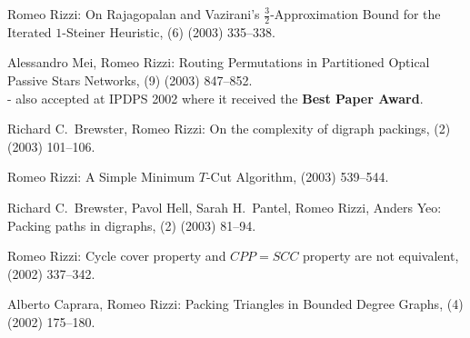 \begin{etaremune}
  \item {\sc Romeo Rizzi:}
   \newblock  On Rajagopalan and Vazirani's $\frac{3}{2}$-Approximation
              Bound for the Iterated $1$-Steiner Heuristic,
   (6) (2003) 335--338.

  \item {\sc Alessandro Mei, Romeo Rizzi:}
   \newblock  Routing Permutations in Partitioned Optical Passive Stars Networks,
   (9) (2003) 847--852.
   \newblock \\ - also accepted at IPDPS 2002 where it received the {\bf Best Paper Award}.

  \item {\sc Richard C.~Brewster, Romeo Rizzi:}
   \newblock  On the complexity of digraph packings,
   (2) (2003) 101--106.

  \item {\sc Romeo Rizzi:}
   \newblock  A Simple Minimum $T$-Cut Algorithm,
    (2003) 539--544.

  \item {\sc Richard C.~Brewster, Pavol Hell, Sarah H.~Pantel, Romeo Rizzi, Anders Yeo:}
   \newblock  Packing paths in digraphs,
   (2) (2003) 81--94.

  \item {\sc Romeo Rizzi:}
   \newblock  Cycle cover property and $CPP=SCC$ property are not equivalent,
    (2002) 337--342.

  \item {\sc Alberto Caprara, Romeo Rizzi:}
   \newblock  Packing Triangles in Bounded Degree Graphs,
   (4) (2002) 175--180.


\end{etaremune}
